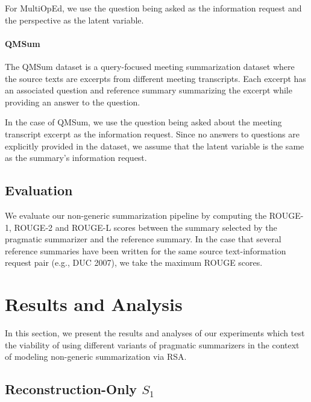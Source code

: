 \documentclass[11pt]{article}
\begin{document}
For MultiOpEd, we use the question being asked as the information request and the perspective as the latent variable.

\paragraph{QMSum} The QMSum dataset \citep{qmsum} is a query-focused meeting summarization dataset where the source texts are excerpts from different meeting transcripts. Each excerpt has an associated question and reference summary summarizing the excerpt while providing an answer to the question.

In the case of QMSum, we use the question being asked about the meeting transcript excerpt as the information request. Since no answers to questions are explicitly provided in the dataset, we assume that the latent variable is the same as the summary's information request.

\subsection{Evaluation}

We evaluate our non-generic summarization pipeline by computing the ROUGE-1, ROUGE-2 and ROUGE-L scores between the summary selected by the pragmatic summarizer and the reference summary. In the case that several reference summaries have been written for the same source text-information request pair (e.g., DUC 2007), we take the maximum ROUGE scores.

\section{Results and Analysis}

In this section, we present the results and analyses of our experiments which test the viability of using different variants of pragmatic summarizers in the context of modeling non-generic summarization via RSA.

\subsection{Reconstruction-Only $S_1$}

\label{sec:prbs}
\end{document}
